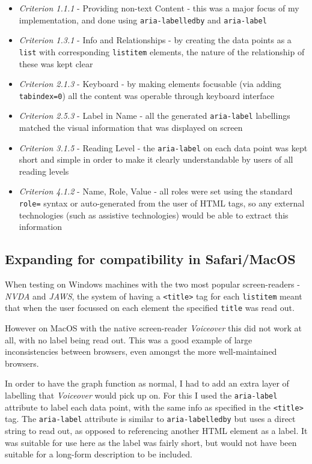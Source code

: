 \documentclass[ %
                    author={Aleena Baig},
                supervisor={Dr Simon Lock},
                    degree={BSc},
                     title={On Making Web Accessible Graphs},
                  subtitle={},
                      year={2019} ]{dissertation}
\begin{document}
\begin{itemize}
    \item \textit{Criterion 1.1.1} - Providing non-text Content - this was a major focus of my implementation, and done using \texttt{aria-labelledby} and \texttt{aria-label}
    \item \textit{Criterion 1.3.1} - Info and Relationships - by creating the data points as a \texttt{list} with corresponding \texttt{listitem} elements, the nature of the relationship of these was kept clear
    \item \textit{Criterion 2.1.3} - Keyboard - by making elements focusable (via adding \texttt{tabindex=0}) all the content was operable through keyboard interface
    \item \textit{Criterion 2.5.3} - Label in Name - all the generated \texttt{aria-label} labellings matched the visual information that was displayed on screen
    \item \textit{Criterion 3.1.5} - Reading Level - the \texttt{aria-label} on each data point was kept short and simple in order to make it clearly understandable by users of all reading levels
    \item \textit{Criterion 4.1.2} - Name, Role, Value - all roles were set using the standard \texttt{role=} syntax or auto-generated from the user of HTML tags, so any external technologies (such as assistive technologies) would be able to extract this information
\end{itemize}

\subsection{Expanding for compatibility in Safari/MacOS}

When testing on Windows machines with the two most popular screen-readers - \textit{NVDA} and \textit{JAWS}, the system of having a \texttt{<title>} tag for each \texttt{listitem} meant that when the user focussed on each element the specified \texttt{title} was read out.

However on MacOS with the native screen-reader \textit{Voiceover} this did not work at all, with no label being read out. This was a good example of large inconsistencies between browsers, even amongst the more well-maintained browsers.

In order to have the graph function as normal, I had to add an extra layer of labelling that \textit{Voiceover} would pick up on. For this I used the \texttt{aria-label} attribute to label each data point, with the same info as specified in the \texttt{<title>} tag. The \texttt{aria-label} attribute is similar to \texttt{aria-labelledby} but uses a direct string to read out, as opposed to referencing another HTML element as a label. It was suitable for use here as the label was fairly short, but would not have been suitable for a long-form description to be included.
\end{document}
